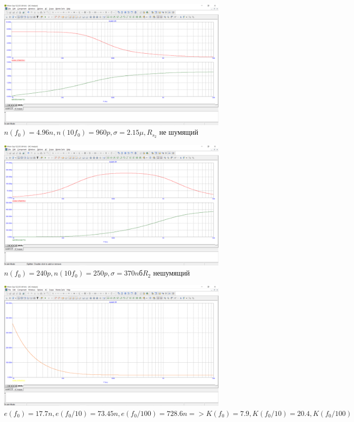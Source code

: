\documentclass[a4paper, 12pt]{article}%
\begin{document}
\begin{figure}
    \centering
    \includegraphics[scale = 0.4 \textwidth]{images/mod4_2_2_2.png}
    \caption{$n(f_0) = 4.96n, n(10 f_0) = 960p, \sigma = 2.15\mu, R_{s_2}$ не шумящий}
    \label{fig:m4222}
\end{figure}

\begin{figure}
    \centering
    \includegraphics[scale = 0.4 \textwidth]{images/mod4_2_2_3.png}
    \caption{$n(f_0) = 240p, n(10 f_0) = 250p, \sigma = 370nб R_2$ нешумящий}
    \label{fig:m4223}
\end{figure}

\begin{figure}
    \centering
    \includegraphics[scale = 0.4 \textwidth]{images/mod4_2_3.png}
    \caption{$e(f_0) = 17.7n, e(f_0/10) = 73.45n, e(f_0/100) = 728.6n => K(f_0) = 7.9, K(f_0/10) = 20.4, K(f_0/100) = 41$}
    \label{fig:m423}
\end{figure}
\FloatBarrier
\end{document}

